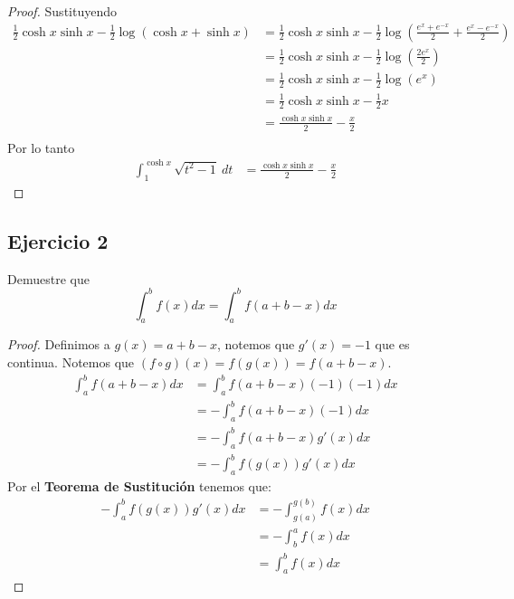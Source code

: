 \documentclass[a4paper]{article}
\begin{document}
\begin{proof}
    Sustituyendo
    \begin{align*}
        \frac{1}{2}\cosh{x}\sinh{x} - \frac{1}{2}\log{\left(\cosh{x} + \sinh{x}\right)} &=
        \frac{1}{2}\cosh{x}\sinh{x} - \frac{1}{2}\log{\left(\frac{e^{x} + e^{-x}}{2} + \frac{e^{x} - e^{-x}}{2}\right)} \\
        &= \frac{1}{2}\cosh{x}\sinh{x} - \frac{1}{2}\log{\left(\frac{2e^{x}}{2}\right)} \\
        &= \frac{1}{2}\cosh{x}\sinh{x} - \frac{1}{2}\log{\left(e^{x}\right)} \\
        &= \frac{1}{2}\cosh{x}\sinh{x} - \frac{1}{2}x \\
        &= \frac{\cosh{x}\sinh{x}}{2} - \frac{x}{2} \\
    \end{align*}
    Por lo tanto 
    \begin{align*}
        \int_{1}^{\cosh{x}} \sqrt{t^2 - 1} \ dt &= \frac{\cosh{x}\sinh{x}}{2} - \frac{x}{2}
    \end{align*}
\end{proof}
\newpage
\subsection{Ejercicio 2}
\noindent
Demuestre que 
\[
    \int_{a}^{b} f(x) dx = \int_{a}^{b} f\left(a + b - x\right) dx
\]
\begin{proof}
    Definimos a \(g(x) = a + b - x\), notemos que \(g'(x) = - 1\) que es continua. 
    Notemos que \(\left(f \circ g\right)(x) = f(g(x)) = f(a + b - x)\). 
    \begin{align*}
        \int_{a}^{b} f(a + b - x) dx &= \int_{a}^{b} f(a + b - x) (-1)(-1) dx \\
                                     &= - \int_{a}^{b} f(a + b - x) (-1) dx \\
                                     &= - \int_{a}^{b} f(a + b - x) g'(x) dx \\
                                     &= - \int_{a}^{b} f(g(x)) g'(x) dx
    \end{align*}
    Por el \textbf{Teorema de Sustitución} tenemos que:
    \begin{align*}
        - \int_{a}^{b} f(g(x)) g'(x) dx &= - \int_{g(a)}^{g(b)} f(x) dx \\
                                      &= - \int_{b}^{a} f(x) dx \\
                                      &= \int_{a}^{b} f(x) dx
    \end{align*}
\end{proof}
\newpage
\end{document}
